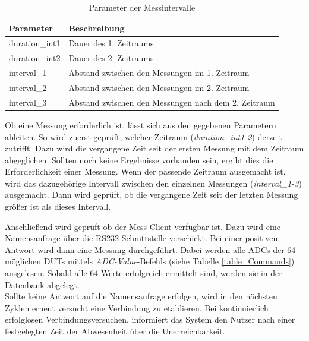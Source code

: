 \begin{table}[H]
\begin{center}
\begin{tabular}{|l|l|}\hline
Parameter & Beschreibung \\ \hline
duration\_int1 & Dauer des 1. Zeitraums\\  \hline
duration\_int2 & Dauer des 2. Zeitraums\\  \hline
interval\_1 & Abstand zwischen den Messungen im 1. Zeitraum\\  \hline
interval\_2 & Abstand zwischen den Messungen im 2. Zeitraum\\  \hline
interval\_3 & Abstand zwischen den Messungen nach dem 2. Zeitraum\\ \hline
\end{tabular}
\caption{Parameter der Messintervalle}
\label{table_ParameterMessintervalle}
\end{center}
\end{table}


Ob eine Messung erforderlich ist, lässt sich aus den gegebenen Parametern ableiten. So wird zuerst geprüft, welcher Zeitraum (\textit{duration\_int1-2}) derzeit zutrifft. Dazu wird die vergangene Zeit seit der ersten Messung mit dem Zeitraum abgeglichen. Sollten noch keine Ergebnisse vorhanden sein, ergibt dies die Erforderlichkeit einer Messung. Wenn der passende Zeitraum ausgemacht ist, wird das dazugehörige Intervall zwischen den einzelnen Messungen (\textit{interval\_1-3}) ausgemacht. Dann wird geprüft, ob die vergangene Zeit seit der letzten Messung größer ist als dieses Intervall.\ 

Anschließend wird geprüft ob der Mess-Client verfügbar ist. Dazu wird eine Namensanfrage über die RS232 Schnittstelle verschickt. Bei einer positiven Antwort wird dann eine Messung durchgeführt. Dabei werden alle \acp{ADC} der 64 möglichen \acp{DUT} mittels \textit{ADC-Value}-Befehls (siehe Tabelle \ref{table_Commands}) ausgelesen. Sobald alle 64 Werte erfolgreich ermittelt sind, werden sie in der Datenbank abgelegt. \\
Sollte keine Antwort auf die Namensanfrage erfolgen, wird in den nächsten Zyklen erneut versucht eine Verbindung zu etablieren. Bei kontinuierlich erfolglosen Verbindungsversuchen, informiert das System den Nutzer nach einer festgelegten Zeit der Abwesenheit über die Unerreichbarkeit.
 

